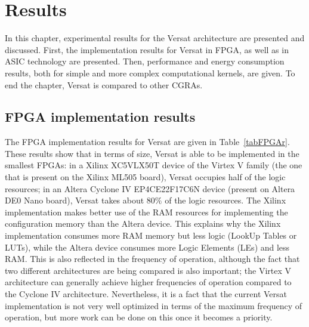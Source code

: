 
\chapter{Results}
\label{chapter:results}

In this chapter, experimental results for the Versat architecture are
presented and discussed. First, the implementation results for Versat
in FPGA, as well as in ASIC technology are presented. Then,
performance and energy consumption results, both for simple and more
complex computational kernels, are given. To end the chapter, Versat
is compared to other CGRAs.

\section{FPGA implementation results}
\label{section:FPGAresults}

The FPGA implementation results for Versat are given in
Table~\ref{tabFPGAr}. These results show that in terms of size, Versat
is able to be implemented in the smallest FPGAs: in a Xilinx XC5VLX50T
device of the Virtex V family (the one that is present on the Xilinx
ML505 board), Versat occupies half of the logic resources; in an
Altera Cyclone IV EP4CE22F17C6N device (present on Altera DE0 Nano
board), Versat takes about $80\%$ of the logic resources. The Xilinx
implementation makes better use of the RAM resources for implementing
the configuration memory than the Altera device. This explains why the
Xilinx implementation consumes more RAM memory but less logic (LookUp
Tables or LUTs), while the Altera device consumes more Logic Elements
(LEs) and less RAM. This is also reflected in the frequency of
operation, although the fact that two different architectures are
being compared is also important; the Virtex V architecture can
generally achieve higher frequencies of operation compared to the
Cyclone IV architecture. Nevertheless, it is a fact that the current
Versat implementation is not very well optimized in terms of the
maximum frequency of operation, but more work can be done on this once
it becomes a priority.

